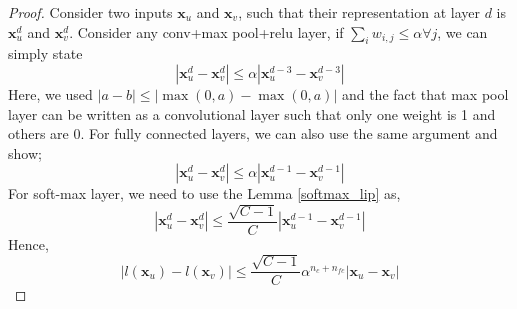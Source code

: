 \documentclass{article}
\begin{document}
\begin{proof}
Consider two inputs $\mathbf{x}_u$ and $\mathbf{x}_v$, such that their representation at layer $d$ is $\mathbf{x}_u^d$ and $\mathbf{x}_v^d$. Consider any conv+max pool+relu layer, if $\sum_i w_{i,j} \leq \alpha \forall j$, we can simply state
\[
|\mathbf{x}_u^d - \mathbf{x}_v^d| \leq  \alpha |\mathbf{x}_u^{d-3} - \mathbf{x}_v^{d-3}|
\] 
Here, we used $|a-b| \leq |\max(0, a) - \max(0,a)|$ and the fact that max pool layer can be written as a convolutional layer such that only one weight is 1 and others are 0. For fully connected layers, we can also use the same argument and show;
\[
|\mathbf{x}_u^d - \mathbf{x}_v^d| \leq  \alpha |\mathbf{x}_u^{d-1} - \mathbf{x}_v^{d-1}|
\] 
For soft-max layer, we need to use the Lemma \ref{softmax_lip} as,
\[
|\mathbf{x}_u^d - \mathbf{x}_v^d| \leq  \frac{\sqrt{C-1}}{C} |\mathbf{x}_u^{d-1} - \mathbf{x}_v^{d-1}|
\] 
Hence,
\[
|l(\mathbf{x}_u) - l(\mathbf{x}_v)| \leq   \frac{\sqrt{C-1}}{C} \alpha^{n_c+n_{fc}}  |\mathbf{x}_u-\mathbf{x}_v|
\]
\end{proof}
\end{document}

